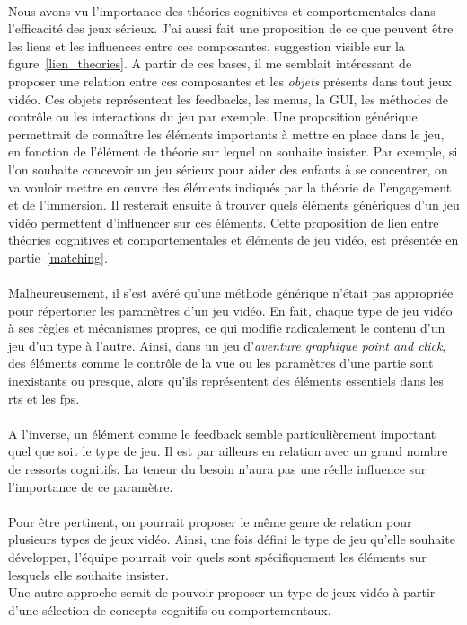	\paragraph{}
Nous avons vu l'importance des théories cognitives et comportementales dans l'efficacité des jeux sérieux. J'ai aussi fait une proposition de ce que peuvent être les liens et les influences entre ces composantes, suggestion visible sur la figure~\ref{lien_theories}. A partir de ces bases, il me semblait intéressant de proposer une relation entre ces composantes et les \emph{objets} présents dans tout jeux vidéo. Ces objets représentent les \glspl{feedback}, les menus, la GUI, les méthodes de contrôle ou les interactions du jeu par exemple. Une proposition générique permettrait de connaître les éléments importants à mettre en place dans le jeu, en fonction de l'élément de théorie sur lequel on souhaite insister. Par exemple, si l'on souhaite concevoir un jeu sérieux pour aider des enfants à se concentrer, on va vouloir mettre en œuvre des éléments indiqués par la théorie de l'engagement et de l'immersion. Il resterait ensuite à trouver quels éléments génériques d'un jeu vidéo permettent d'influencer sur ces éléments.
Cette proposition de lien entre théories cognitives et comportementales et éléments de jeu vidéo, est présentée en partie~\ref{matching}.

\paragraph{}Malheureusement, il s'est avéré qu'une méthode générique n'était pas appropriée pour répertorier les paramètres d'un jeu vidéo. En fait, chaque type de jeu vidéo à ses règles et mécanismes propres, ce qui modifie radicalement le contenu d'un jeu d'un type à l'autre. Ainsi, dans un jeu d'\emph{aventure graphique point and click}, des éléments comme le contrôle de la vue ou les paramètres d'une partie sont inexistants ou presque, alors qu'ils représentent des éléments essentiels dans les \gls{rts} et les \gls{fps}.
\paragraph{}A l'inverse, un élément comme le \gls{feedback} semble particulièrement important quel que soit le type de jeu. Il est par ailleurs en relation avec un grand nombre de ressorts cognitifs. La teneur du besoin n'aura pas une réelle influence sur l'importance de ce paramètre.

\paragraph{}Pour être pertinent, on pourrait proposer le même genre de relation pour plusieurs types de jeux vidéo. Ainsi, une fois défini le type de jeu qu'elle souhaite développer, l'équipe pourrait voir quels sont spécifiquement les éléments sur lesquels elle souhaite insister. \\
Une autre approche serait de pouvoir proposer un type de jeux vidéo à partir d'une sélection de concepts cognitifs ou comportementaux.

